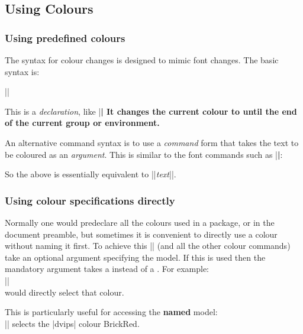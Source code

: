 \subsection{Using Colours}

\subsubsection{Using predefined colours}
The syntax for colour changes is designed to mimic font changes.
The basic syntax is:

\begin{decl}
|\color|
\end{decl}

This is a \emph{declaration}, like |\bfseries| It changes the current
colour to  until the end of the current group or
environment.

An alternative command syntax is to use a \emph{command} form that
takes the text to be coloured as an \emph{argument}. This is similar
to the font commands such as |\textbf|:



So the above is essentially equivalent to
|{\color|\emph{text}|}|.

\subsubsection{Using colour specifications directly}



Normally one would predeclare all the colours used in a package, or in
the document preamble, but sometimes it is convenient to directly use
a colour without naming it first. To achieve this |\color| (and all
the other colour commands) take an optional argument specifying the
model. If this is used then the mandatory argument takes a
 instead of a . For example:\\
|\color[rgb]{1,0.2,0.3}|\\
would directly select that colour.

This is particularly useful for accessing the \textbf{named} model:\\
|\color[named]{BrickRed}| selects the |dvips| colour BrickRed.

